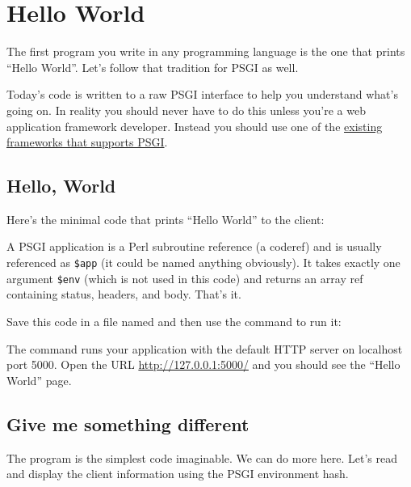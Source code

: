 \chapter{Hello World}\label{day-2-hello-world}

The first program you write in any programming language is the one that
prints ``Hello World''. Let's follow that tradition for PSGI as well.

\begin{note}
  Today's code is written to a raw PSGI interface to help
you understand what's going on. In reality you should never have to do
this unless you're a web application framework developer. Instead you
should use one of the \href{http://plackperl.org/\#frameworks}{existing
frameworks that supports PSGI}.
\end{note}

\section{Hello, World}\label{hello-world}

Here's the minimal code that prints ``Hello World'' to the client:


A PSGI application is a Perl subroutine reference (a coderef) and is
usually referenced as \lstinline!$app! (it could be named anything
obviously). It takes exactly one argument \lstinline!$env! (which is not
used in this code) and returns an array ref containing status, headers,
and body. That's it.

Save this code in a file named  and then use the
 command to run it:


The  command runs your application with the default HTTP server
 on localhost port 5000. Open the URL
\url{http://127.0.0.1:5000/} and you should see the ``Hello World'' page.

\section{Give me something
different}\label{give-me-something-different}

The program  is the simplest code imaginable. We can do more here. Let's
read and display the client information using the PSGI environment hash.

